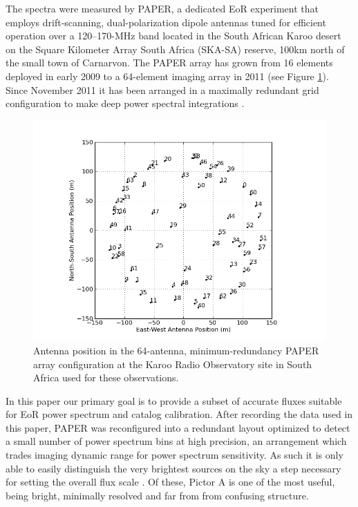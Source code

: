 \documentclass[preprint]{aastex}
\begin{document}
The spectra were measured by PAPER, a dedicated EoR experiment 
that employs drift-scanning, dual-polarization dipole antennas 
tuned for efficient operation over a 120--170-MHz band located in the South African Karoo desert
on the Square Kilometer Array
South Africa (SKA-SA) reserve, 100km north of the small town of Carnarvon.
The PAPER array has grown from 16 elements deployed in early 2009 to a
64-element imaging array in 2011 (see Figure \ref{fig:antpos}). Since November 2011 it has been arranged in a maximally redundant grid configuration to make deep power spectral integrations \citep{Parsons:2012a}.
\begin{figure}\centering
\includegraphics[width=0.85\columnwidth]{plots/antpos.png}
\caption{Antenna position in the 64-antenna, minimum-redundancy PAPER array configuration at the Karoo Radio Observatory site in South Africa used for these observations.
}\label{fig:antpos}
\end{figure}

In this paper our primary goal is to provide a subset of accurate fluxes
suitable for EoR power spectrum and catalog calibration.  After recording the
data used in this paper, PAPER was reconfigured into a redundant layout
optimized to detect a small number of power spectrum bins at high precision, an
arrangement which trades imaging dynamic range for power spectrum sensitivity.
As such it is only able to easily distinguish the very brightest sources on the
sky a step necessary for setting the overall flux scale \citep{Parsons2013b}. Of these, Pictor A is
one of the most useful, being bright, minimally resolved and far from from
confusing structure. 
\end{document}
